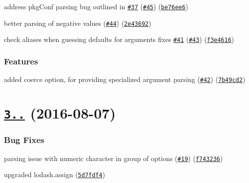 \begin{DoxyItemize}
\item address pkg\+Conf parsing bug outlined in \href{https://github.com/yargs/yargs-parser/issues/37}{\tt \#37} (\href{https://github.com/yargs/yargs-parser/issues/45}{\tt \#45}) (\href{https://github.com/yargs/yargs-parser/commit/be76ee6}{\tt be76ee6})
\item better parsing of negative values (\href{https://github.com/yargs/yargs-parser/issues/44}{\tt \#44}) (\href{https://github.com/yargs/yargs-parser/commit/2e43692}{\tt 2e43692})
\item check aliases when guessing defaults for arguments fixes \href{https://github.com/yargs/yargs-parser/issues/41}{\tt \#41} (\href{https://github.com/yargs/yargs-parser/issues/43}{\tt \#43}) (\href{https://github.com/yargs/yargs-parser/commit/f3e4616}{\tt f3e4616})
\end{DoxyItemize}

\subsubsection*{Features}


\begin{DoxyItemize}
\item added coerce option, for providing specialized argument parsing (\href{https://github.com/yargs/yargs-parser/issues/42}{\tt \#42}) (\href{https://github.com/yargs/yargs-parser/commit/7b49cd2}{\tt 7b49cd2})
\end{DoxyItemize}

\label{_3.0.0}%
 \section*{\href{https://github.com/yargs/yargs-parser/compare/v2.4.1...v3.0.0}{\tt 3..} (2016-\/08-\/07)}

\subsubsection*{Bug Fixes}


\begin{DoxyItemize}
\item parsing issue with numeric character in group of options (\href{https://github.com/yargs/yargs-parser/issues/19}{\tt \#19}) (\href{https://github.com/yargs/yargs-parser/commit/f743236}{\tt f743236})
\item upgraded lodash.\+assign (\href{https://github.com/yargs/yargs-parser/commit/5d7fdf4}{\tt 5d7fdf4})
\end{DoxyItemize}

